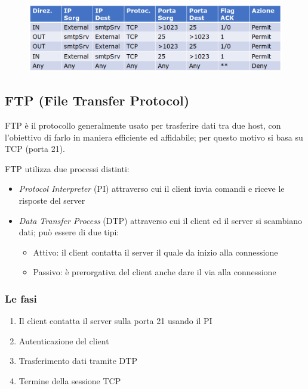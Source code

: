 \begin{figure}[H]
    \centering
    \includegraphics[width=1\linewidth]{chapters/12/images/smtp.png}
\end{figure}

\subsection{FTP (File Transfer Protocol)}
FTP è il protocollo generalmente usato per trasferire dati tra due host, con l'obiettivo 
di farlo in maniera efficiente ed affidabile; per questo motivo si basa su TCP (porta 21).

\noindent FTP utilizza due processi distinti:
\begin{itemize}
    \item \textit{Protocol Interpreter} (PI) attraverso cui il client invia comandi e riceve le risposte del server 
    \item \textit{Data Transfer Process} (DTP) attraverso cui il client ed il server si scambiano dati;
    può essere di due tipi:
    \begin{itemize}
        \item Attivo: il client contatta il server il quale da inizio alla connessione 
        \item Passivo: è prerorgativa del client anche dare il via alla connessione
    \end{itemize}
\end{itemize}

\subsubsection{Le fasi}
\begin{enumerate}
    \item Il client contatta il server sulla porta 21 usando il PI
    \item Autenticazione del client 
    \item Trasferimento dati tramite DTP 
    \item Termine della sessione TCP 
\end{enumerate}

